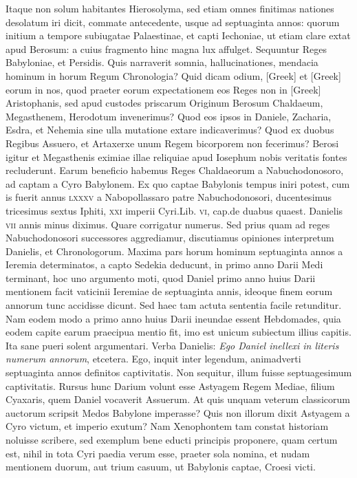 Itaque non solum
habitantes Hierosolyma, sed etiam omnes finitimas nationes desolatum
iri dicit, commate antecedente, usque ad septuaginta annos:
quorum initium a tempore subiugatae Palaestinae, et capti Iechoniae,
ut etiam clare extat apud Berosum: a cuius fragmento hinc
magna lux affulget.
Sequuntur Reges Babyloniae, et Persidis.
Quis narraverit somnia, hallucinationes, mendacia hominum in horum
Regum Chronologia?
Quid dicam odium, \textgreek{[Greek]} et \textgreek{[Greek]}
eorum in nos, quod praeter eorum expectationem eos Reges non
in \textgreek{[Greek]} Aristophanis, sed apud custodes priscarum Originum
Berosum Chaldaeum, Megasthenem, Herodotum invenerimus?
Quod eos ipsos in Daniele, Zacharia, Esdra, et Nehemia sine
ulla mutatione extare indicaverimus?
Quod ex duobus Regibus
Assuero, et Artaxerxe unum Regem bicorporem non fecerimus?
Berosi igitur et Megasthenis eximiae illae reliquiae apud Iosephum
nobis veritatis fontes recluderunt.
Earum beneficio habemus Reges
Chaldaeorum a Nabuchodonosoro, ad captam a Cyro Babylonem.
Ex quo captae Babylonis tempus iniri potest, cum is fuerit annus
\textsc{lxxxv} a Nabopollassaro patre Nabuchodonosori, ducentesimus
tricesimus sextus Iphiti,
 \textsc{xxi} imperii Cyri.Lib. \textsc{vi}, cap.de duabus
quaest.
Danielis \textsc{vii} annis minus diximus.
Quare corrigatur
numerus.
Sed prius quam ad reges Nabuchodonosori successores aggrediamur,
discutiamus opiniones interpretum Danielis, et Chronologorum.
Maxima pars horum hominum septuaginta annos a
Ieremia determinatos, a capto Sedekia deducunt, in primo anno
Darii Medi terminant, hoc uno argumento moti, quod Daniel primo
anno huius Darii mentionem facit vaticinii Ieremiae de septuaginta
annis, ideoque finem eorum annorum tunc accidisse dicunt.
Sed haec tam actuta sententia facile retunditur.
Nam eodem modo
a primo anno huius Darii ineundae essent Hebdomades, quia eodem
capite earum praecipua mentio fit, imo est unicum subiectum illius
capitis.
Ita sane pueri solent argumentari.
Verba Danielis: \textit{Ego
Daniel inellexi in literis numerum annorum}, etcetera.
Ego, inquit inter
legendum, animadverti septuaginta annos definitos captivitatis.
Non sequitur, illum fuisse septuagesimum captivitatis.
Rursus hunc
Darium volunt esse Astyagem Regem Mediae, filium Cyaxaris,
quem Daniel vocaverit Assuerum.
At quis unquam veterum classicorum
auctorum scripsit Medos Babylone imperasse?
Quis non
illorum dixit Astyagem a Cyro victum, et imperio exutum?
Nam Xenophontem tam constat historiam noluisse scribere, sed exemplum
bene educti principis proponere, quam certum est, nihil in tota Cyri
paedia verum esse, praeter sola nomina, et nudam mentionem duorum,
aut trium casuum, ut Babylonis captae, Croesi victi.

